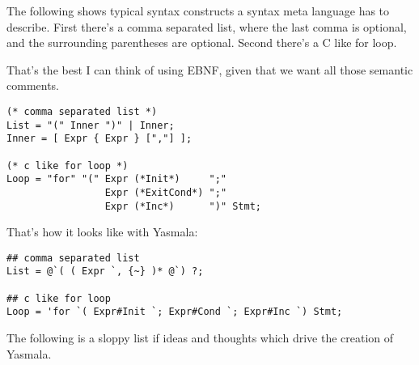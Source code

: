 \documentclass[a4paper]{report}
\begin{document}
The following shows typical syntax constructs a syntax meta language has to
describe. First there's a comma separated list, where the last comma is
optional, and the surrounding parentheses are optional. Second there's a C like
for loop.

That's the best I can think of using EBNF, given that we want all those semantic
comments. 

\begin{verbatim}
(* comma separated list *)
List = "(" Inner ")" | Inner;
Inner = [ Expr { Expr } [","] ];

(* c like for loop *)
Loop = "for" "(" Expr (*Init*)     ";"
                 Expr (*ExitCond*) ";"
                 Expr (*Inc*)      ")" Stmt;
\end{verbatim}

That's how it looks like with Yasmala:

\begin{verbatim}
## comma separated list
List = @`( ( Expr `, {~} )* @`) ?;

## c like for loop
Loop = 'for `( Expr#Init `; Expr#Cond `; Expr#Inc `) Stmt;
\end{verbatim}

The following is a sloppy list if ideas and thoughts which drive the creation of
Yasmala.
\end{document}
